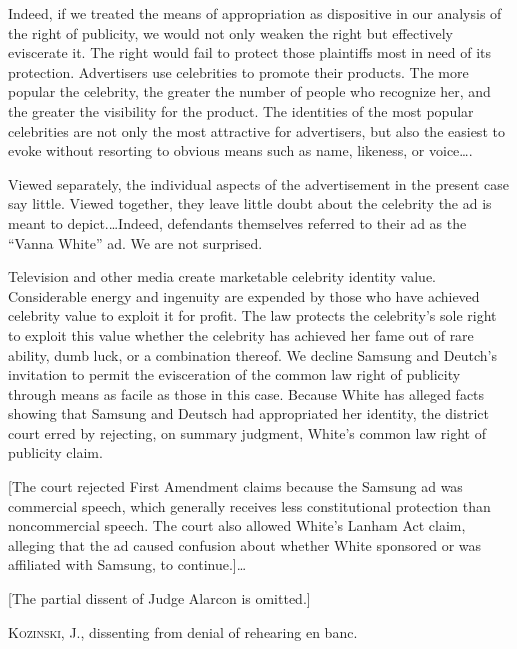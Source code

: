 Indeed, if we treated the means of appropriation as dispositive in our analysis
of the right of publicity, we would not only weaken the right but effectively
eviscerate it. The right would fail to protect those plaintiffs most in need of
its protection. Advertisers use celebrities to promote their products. The more
popular the celebrity, the greater the number of people who recognize her, and
the greater the visibility for the product. The identities of the most popular
celebrities are not only the most attractive for advertisers, but also the
easiest to evoke without resorting to obvious means such as name, likeness, or
voice\dots.

Viewed separately, the individual aspects of the advertisement in the present
case say little. Viewed together, they leave little doubt about the celebrity
the ad is meant to depict.\dots Indeed, defendants themselves referred to
their ad as the ``Vanna White'' ad. We are not surprised.

Television and other media create marketable celebrity identity value.
Considerable energy and ingenuity are expended by those who have achieved
celebrity value to exploit it for profit. The law protects the celebrity's sole
right to exploit this value whether the celebrity has achieved her fame out of
rare ability, dumb luck, or a combination thereof. We decline Samsung and
Deutch's invitation to permit the evisceration of the common law right of
publicity through means as facile as those in this case. Because White has
alleged facts showing that Samsung and Deutsch had appropriated her identity,
the district court erred by rejecting, on summary judgment, White's common law
right of publicity claim.

[The court rejected First Amendment claims because the Samsung ad was commercial
speech, which generally receives less constitutional protection than
noncommercial speech.  The court also allowed White's Lanham Act claim,
alleging that the ad caused confusion about whether White sponsored or was
affiliated with Samsung, to continue.]\dots

[The partial dissent of Judge Alarcon is omitted.]


\opinion \textsc{Kozinski}, J., dissenting from denial of rehearing en banc.

